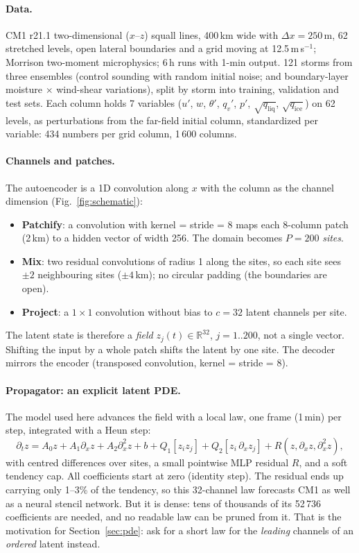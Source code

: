 \documentclass[11pt]{article}
\newcommand{\dx}{\partial_x}
\begin{document}
\paragraph{Data.} CM1 r21.1 two-dimensional ($x$--$z$) squall lines, 400\,km wide with $\Delta x = 250$\,m, 62 stretched levels, open lateral boundaries and a grid moving at 12.5\,m\,s$^{-1}$; Morrison two-moment microphysics; 6\,h runs with 1-min output. 121 storms from three ensembles (control sounding with random initial noise; and boundary-layer moisture $\times$ wind-shear variations), split by storm into training, validation and test sets. Each column holds 7 variables ($u'$, $w$, $\theta'$, $q_v'$, $p'$, $\sqrt{q_\mathrm{liq}}$, $\sqrt{q_\mathrm{ice}}$) on 62 levels, as perturbations from the far-field initial column, standardized per variable: 434 numbers per grid column, 1\,600 columns.

\paragraph{Channels and patches.} The autoencoder is a 1D convolution along $x$ with the column as the channel dimension (Fig.~\ref{fig:schematic}):
\begin{itemize}
\item \textbf{Patchify}: a convolution with kernel = stride = 8 maps each 8-column patch (2\,km) to a hidden vector of width 256. The domain becomes $P = 200$ \emph{sites}.
\item \textbf{Mix}: two residual convolutions of radius 1 along the sites, so each site sees $\pm 2$ neighbouring sites ($\pm4$\,km); no circular padding (the boundaries are open).
\item \textbf{Project}: a $1\times1$ convolution without bias to $c = 32$ latent channels per site.
\end{itemize}
The latent state is therefore a \emph{field} $z_j(t) \in \mathbb{R}^{32}$, $j = 1..200$, not a single vector. Shifting the input by a whole patch shifts the latent by one site. The decoder mirrors the encoder (transposed convolution, kernel = stride = 8).

\paragraph{Propagator: an explicit latent PDE.} The model used here advances the field with a local law, one frame (1\,min) per step, integrated with a Heun step:
\begin{equation}
\partial_t z = A_0 z + A_1 \dx z + A_2 \partial_x^2 z + b + Q_1[z_i z_j] + Q_2[z_i\, \dx z_j] + R(z, \dx z, \partial_x^2 z),
\label{eq:law}
\end{equation}
with centred differences over sites, a small pointwise MLP residual $R$, and a soft tendency cap. All coefficients start at zero (identity step). The residual ends up carrying only 1--3\% of the tendency, so this 32-channel law forecasts CM1 as well as a neural stencil network. But it is dense: tens of thousands of its 52\,736 coefficients are needed, and no readable law can be pruned from it. That is the motivation for Section~\ref{sec:pde}: ask for a short law for the \emph{leading} channels of an \emph{ordered} latent instead.
\end{document}
